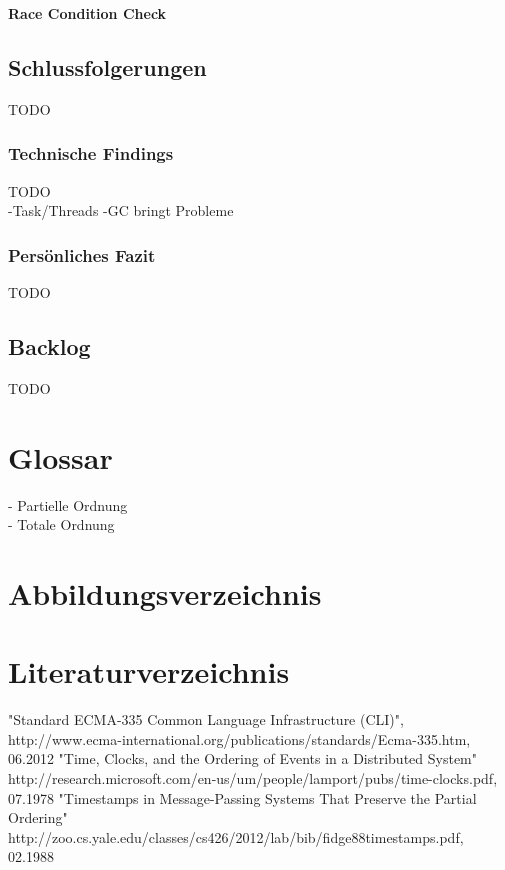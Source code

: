 \documentclass[10pt,a4paper]{article}
\begin{document}
\textbf{Race Condition Check}
\begin{flushleft}

\end{flushleft}
\subsection{Schlussfolgerungen}
TODO
\subsubsection{Technische Findings}
TODO\\
-Task/Threads
-GC bringt Probleme
\subsubsection{Persönliches Fazit}
TODO
\subsection{Backlog}
TODO
\section{Glossar}
- Partielle Ordnung\\
- Totale Ordnung
\section{Abbildungsverzeichnis}
\makeatletter
{}
\makeatother
\section{Literaturverzeichnis}
\renewcommand{\section}[2]{}%
\begin{thebibliography}{xxxxxxxxxxxxx}
"Standard ECMA-335 Common Language Infrastructure (CLI)", http://www.ecma-international.org/publications/standards/Ecma-335.htm, 06.2012
"Time, Clocks, and the Ordering of Events in a Distributed System" http://research.microsoft.com/en-us/um/people/lamport/pubs/time-clocks.pdf, 07.1978
"Timestamps in Message-Passing Systems That Preserve the Partial Ordering" http://zoo.cs.yale.edu/classes/cs426/2012/lab/bib/fidge88timestamps.pdf, 02.1988
\end{thebibliography}
\end{document}
